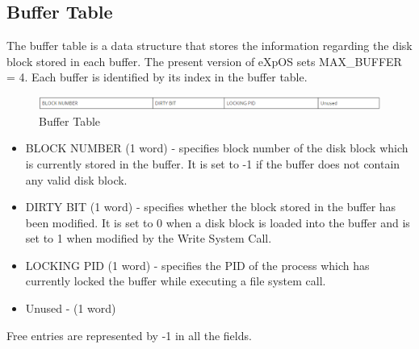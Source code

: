 \subsection{Buffer Table}
The buffer table is a data structure that stores the information regarding the disk block stored in each buffer. The present version of eXpOS sets MAX\_BUFFER = 4. Each buffer is identified by its index in the buffer table.
\begin{figure}[ht]
\centering
\includegraphics  [scale=0.55]{figures/bt.png}
\caption{\footnotesize Buffer Table}
\end{figure}
\begin {itemize}
\item BLOCK NUMBER (1 word) - specifies block number of the disk block which is currently stored in the buffer. It is set to -1 if the buffer does not contain any valid disk block.
\item DIRTY BIT (1 word) - specifies whether the block stored in the buffer has been modified. It is set to 0 when a disk block is loaded into the buffer and is set to 1 when modified by the Write System Call.
\item LOCKING PID (1 word) - specifies the PID of the process which has currently locked the buffer while executing a file system call.
\item Unused - (1 word)
\end {itemize}

Free entries are represented by -1 in all the fields.

